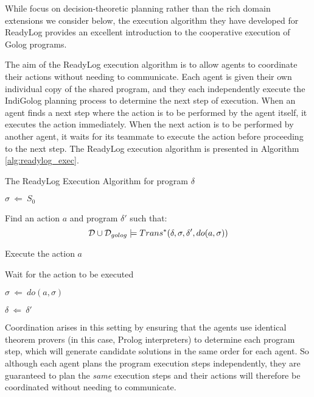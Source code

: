 While \citeauthor{Ferrein2005readylog} focus on decision-theoretic
planning rather than the rich domain extensions we consider below,
the execution algorithm they have developed for ReadyLog provides
an excellent introduction to the cooperative execution of Golog programs.

The aim of the ReadyLog execution algorithm is to allow agents to
coordinate their actions without needing to communicate. Each agent
is given their own individual copy of the shared program, and they
each independently execute the IndiGolog planning process to determine
the next step of execution. When an agent finds a next step where
the action is to be performed by the agent itself, it executes the
action immediately. When the next action is to be performed by another
agent, it waits for its teammate to execute the action before proceeding
to the next step. The ReadyLog execution algorithm is presented in
Algorithm \ref{alg:readylog_exec}.

%
\begin{algorithm}[t]
\caption{The ReadyLog Execution Algorithm for program $\delta$}


\label{alg:readylog_exec} \begin{algorithmic}

\STATE $\sigma\ \Leftarrow\ S_{0}$


\STATE Find an action $a$ and program $\delta'$ such that:\[
\mathcal{D}\cup\mathcal{D}_{golog}\models Trans^{*}(\delta,\sigma,\delta',do(a,\sigma))\]



\STATE Execute the action $a$

\ELSE

\STATE Wait for the action to be executed

\ENDIF

\STATE $\sigma\ \Leftarrow\ do(a,\sigma)$

\STATE $\delta\ \Leftarrow\ \delta'$

\ENDWHILE

\end{algorithmic} 
\end{algorithm}


Coordination arises in this setting by ensuring that the agents use
identical theorem provers (in this case, Prolog interpreters) to determine
each program step, which will generate candidate solutions in the
same order for each agent. So although each agent plans the program
execution steps independently, they are guaranteed to plan the \emph{same}
execution steps and their actions will therefore be coordinated without
needing to communicate.


